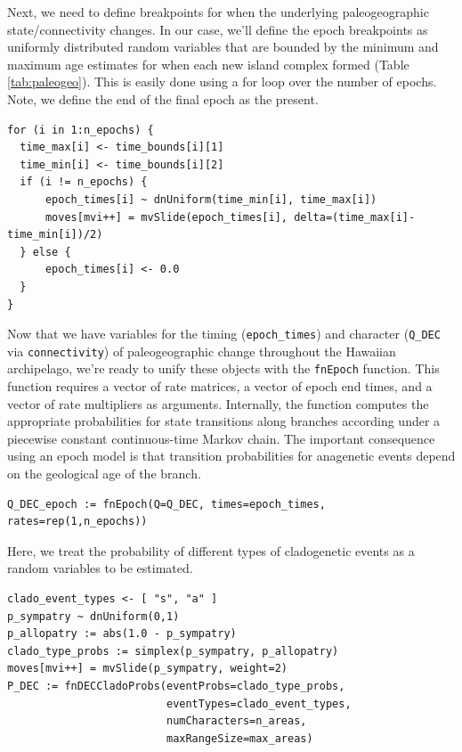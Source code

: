 Next, we need to define breakpoints for when the underlying paleogeographic state/connectivity changes.
In our case, we'll define the epoch breakpoints as uniformly distributed random variables that are bounded by the minimum and maximum age estimates for when each new island complex formed (Table \ref{tab:paleogeo}).
This is easily done using a for loop over the number of epochs.
Note, we define the end of the final epoch as the present.

\begin{snugshade}
\begin{lstlisting}
for (i in 1:n_epochs) {
  time_max[i] <- time_bounds[i][1]
  time_min[i] <- time_bounds[i][2]
  if (i != n_epochs) {
      epoch_times[i] ~ dnUniform(time_min[i], time_max[i])
      moves[mvi++] = mvSlide(epoch_times[i], delta=(time_max[i]-time_min[i])/2)
  } else {
      epoch_times[i] <- 0.0
  }
}
\end{lstlisting}
\end{snugshade}

Now that we have variables for the timing ({\tt epoch\_times}) and character ({\tt Q\_DEC} via {\tt connectivity}) of paleogeographic change throughout the Hawaiian archipelago, we're ready to unify these objects with the {\tt fnEpoch} function.
This function requires a vector of rate matrices, a vector of epoch end times, and a vector of rate multipliers as arguments.
Internally, the function computes the appropriate probabilities for state transitions along branches according under a piecewise constant continuous-time Markov chain.
The important consequence using an epoch model is that transition probabilities for anagenetic events depend on the geological age of the branch.

\begin{snugshade}
\begin{lstlisting}
Q_DEC_epoch := fnEpoch(Q=Q_DEC, times=epoch_times, rates=rep(1,n_epochs))
\end{lstlisting}
\end{snugshade}

Here, we treat the probability of different types of cladogenetic events as a random variables to be estimated.

\begin{snugshade}
\begin{lstlisting}
clado_event_types <- [ "s", "a" ]
p_sympatry ~ dnUniform(0,1)
p_allopatry := abs(1.0 - p_sympatry)
clado_type_probs := simplex(p_sympatry, p_allopatry)
moves[mvi++] = mvSlide(p_sympatry, weight=2)
P_DEC := fnDECCladoProbs(eventProbs=clado_type_probs,
                         eventTypes=clado_event_types,
                         numCharacters=n_areas,
                         maxRangeSize=max_areas)
\end{lstlisting}
\end{snugshade}

